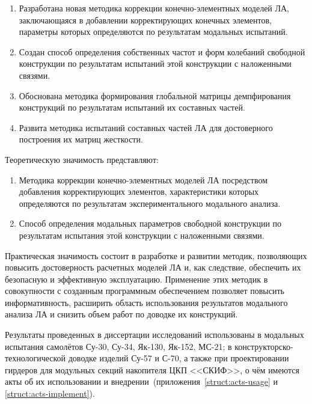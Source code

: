 {\novelty}
\begin{enumerate}[beginpenalty = 10000] 
	\item Разработана новая методика коррекции конечно-элементных моделей ЛА, заключающаяся в добавлении корректирующих конечных элементов, параметры которых определяются по результатам модальных испытаний.
	\item Создан способ определения собственных частот и форм колебаний свободной конструкции по результатам испытаний этой конструкции с наложенными связями.
	\item Обоснована методика формирования глобальной матрицы демпфирования конструкций по результатам испытаний их составных частей.
	\item Развита методика испытаний составных частей ЛА для достоверного построения их матриц жесткости.
\end{enumerate}

{\influence}

Теоретическую значимость представляют:

\begin{enumerate}[beginpenalty = 10000] 
	\item Методика коррекции конечно-элементных моделей ЛА посредством добавления корректирующих элементов, характеристики которых определяются по результатам экспериментального модального анализа.
	\item Способ определения модальных параметров свободной конструкции по результатам испытания этой конструкции с наложенными связями. 
\end{enumerate}

Практическая значимость состоит в разработке и развитии методик, позволяющих повысить достоверность расчетных моделей ЛА и, как следствие, обеспечить их безопасную и эффективную эксплуатацию. Применение этих методик в совокупности с созданным программным обеспечением позволяет повысить информативность, расширить область использования результатов модального анализа ЛА и снизить объем работ по доводке их конструкций.

Результаты проведенных в диссертации исследований использованы в модальных испытания самолётов \mbox{Су-30}, \mbox{Су-34}, \mbox{Як-130}, \mbox{Як-152}, \mbox{МС-21}; в конструкторско-технологической доводке изделий \mbox{Су-57} и \mbox{С-70}, а также при проектировании  гирдеров для модульных секций накопителя ЦКП <<СКИФ>>, о чём имеются акты об их использовании и внедрении~(приложения~\ref{struct:acts-usage} и \ref{struct:acts-implement}).


